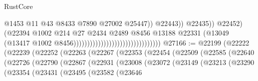 \begin{lexlean}{RustCore}
\begin{coremodule}
                                                                            @1453
                                                                            @11
                                                                            @43
                                                                            @8433
                                                                            @7890
                                                                            @27002
                                                                            @25447))
                                                                        @22443))
                                                                    @22435))
                                                                @22452)
                                                              (@22394
                                                                @1002
                                                                @214
                                                                @27
                                                                @2434
                                                                @2489
                                                                @8456
                                                                @13188
                                                                @22331
                                                                (@13049
                                                                  (@13417
                                                                    @1002
                                                                    @8456))))))))))))))))))))))))))))))))
@27166 := @22199
    (@22222
      (@22239
        (@22252
          (@22263
            (@22267
              (@22353
                (@22454
                  (@22509
                    (@22585
                      (@22640
                        (@22726
                          (@22790
                            (@22867
                              (@22931
                                (@23008
                                  (@23072
                                    (@23149
                                      (@23213
                                        (@23290
                                          (@23354
                                            (@23431
                                              (@23495
                                                (@23582
                                                  (@23646

\end{coremodule}
\end{lexlean}

